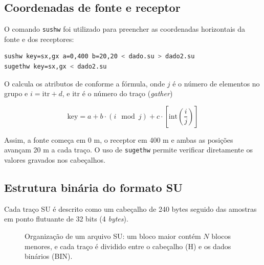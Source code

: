 \documentclass[12pt,a4paper]{article}
\begin{document}
\subsection{Coordenadas de fonte e receptor}

O comando \texttt{sushw} foi utilizado para preencher as coordenadas
horizontais da fonte e dos receptores:

\begin{lstlisting}[language=bash]
sushw key=sx,gx a=0,400 b=20,20 < dado.su > dado2.su
sugethw key=sx,gx < dado2.su
\end{lstlisting}

O  calcula os atributos de  conforme a fórmula, onde $j$ é o número de elementos no grupo e $i=\text{itr}+d$, e $\text{itr}$ é o número do traço (\textit{gather})

\begin{equation}
    \text{key} = a + b \cdot (i \mod j) + c \cdot \left[\text{int}\left(\frac{i}{j}\right)\right]
\end{equation}

Assim, a fonte começa em 0 m, o receptor em 400 m e ambas as posições avançam 20 m a cada traço. O uso de \texttt{sugethw} permite verificar diretamente os valores gravados nos cabeçalhos.

\subsection{Estrutura binária do formato SU}

Cada traço SU é descrito como um cabeçalho de 240 bytes seguido das amostras em ponto flutuante de 32 bits (4 \textit{bytes}).

\begin{figure}[H]
\centering
{}
\caption{Organização de um arquivo SU: um bloco maior contém $N$ blocos
menores, e cada traço é dividido entre o cabeçalho (H) e os dados binários (BIN).}
\label{fig:estrutura-formato-su}
\end{figure}
\end{document}
